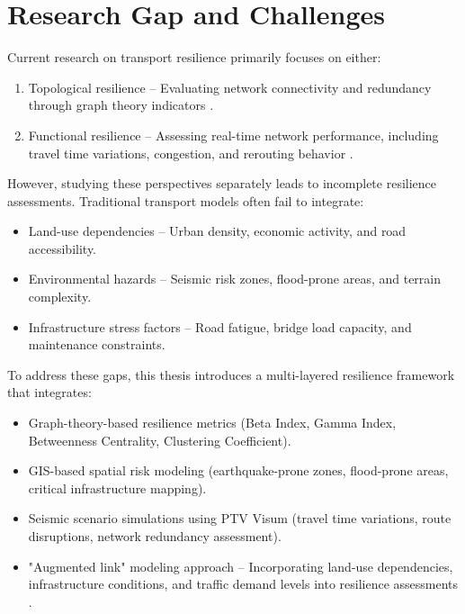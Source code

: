 \section{Research Gap and Challenges}
Current research on transport resilience primarily focuses on either:
\begin{enumerate}
    \item Topological resilience – Evaluating network connectivity and redundancy through graph theory indicators \cite{wang2019}.
    \item Functional resilience – Assessing real-time network performance, including travel time variations, congestion, and rerouting behavior \cite{bell1999}.
\end{enumerate}
However, studying these perspectives separately leads to incomplete resilience assessments. Traditional transport models often fail to integrate:
\begin{itemize}
    \item Land-use dependencies – Urban density, economic activity, and road accessibility.
    \item Environmental hazards – Seismic risk zones, flood-prone areas, and terrain complexity.
    \item Infrastructure stress factors – Road fatigue, bridge load capacity, and maintenance constraints.
\end{itemize}
To address these gaps, this thesis introduces a multi-layered resilience framework that integrates:
\begin{itemize}
    \item Graph-theory-based resilience metrics (Beta Index, Gamma Index, Betweenness Centrality, Clustering Coefficient).
    \item GIS-based spatial risk modeling (earthquake-prone zones, flood-prone areas, critical infrastructure mapping).
    \item Seismic scenario simulations using PTV Visum (travel time variations, route disruptions, network redundancy assessment).
    \item "Augmented link" modeling approach – Incorporating land-use dependencies, infrastructure conditions, and traffic demand levels into resilience assessments \cite{postorino2025}.
\end{itemize}

